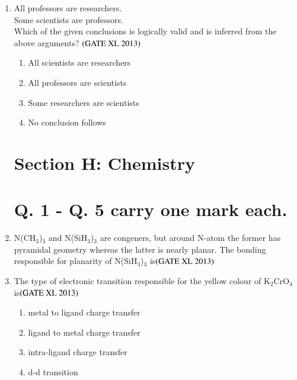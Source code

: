 \documentclass[journal]{IEEEtran}
\begin{document}
\begin{enumerate}
\item  
All professors are researchers.\\
Some scientists are professors.\\
Which of the given conclusions is logically valid and is inferred from the above arguments? \hfill $\left(\text{GATE XL 2013}\right)$
\begin{enumerate}
    \item All scientists are researchers
    \item All professors are scientists
    \item Some researchers are scientists
    \item No conclusion follows
\end{enumerate}

\clearpage\section*{Section H: Chemistry}
\setcounter{enumi}{0}
\section*{Q. 1 - Q. 5 carry one mark each.}

\item N(CH$_3$)$_3$ and N(SiH$_3$)$_3$ are congeners, but around N-atom the former has pyramidal geometry whereas the latter is nearly planar. The bonding responsible for planarity of N(SiH$_3$)$_3$ is\hfill $\left(\text{GATE XL 2013}\right)$
\begin{enumerate}
\end{enumerate}

\item The type of electronic transition responsible for the yellow colour of K$_2$CrO$_4$ is\hfill $\left(\text{GATE XL 2013}\right)$
\begin{enumerate}
    \item metal to ligand charge transfer
    \item ligand to metal charge transfer
    \item intra-ligand charge transfer
    \item d-d transition
\end{enumerate}


\end{enumerate}
\end{document}
